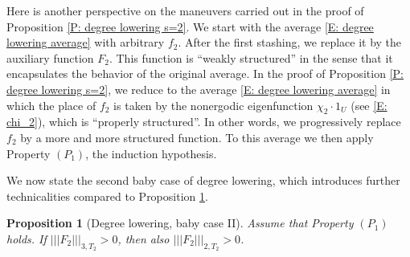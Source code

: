 \documentclass[11pt]{amsart}
\newtheorem{proposition}[lemma]{Proposition}
\theoremstyle{definition}
\newcommand{\nnorm}[1]{\lvert\!|\!| #1|\!|\!\rvert}
\newcommand{\1}{{\mathbf{1}}}
\begin{document}
Here is another perspective on the maneuvers carried out in the proof of Proposition \ref{P: degree lowering s=2}. We start with the average \eqref{E: degree lowering average} with arbitrary $f_2$. After the first stashing, we replace it by the auxiliary function $F_2$. This function is ``weakly structured'' in the sense that it encapsulates the behavior of the original average. In the proof of Proposition \ref{P: degree lowering s=2}, we reduce to the average \eqref{E: degree lowering average} in which the place of $f_2$ is taken by the nonergodic eigenfunction $\chi_2\cdot 1_U$ (see \eqref{E: chi_2}), which is ``properly structured''. In other words, we progressively replace $f_2$ by a more and more structured function. To this average we then apply Property $(P_1)$, the induction hypothesis.

We now state the second baby case of degree lowering, which introduces further technicalities compared to Proposition \ref{P: degree lowering s=3}.
\begin{proposition}[Degree lowering, baby case II]\label{P: degree lowering s=3}
    Assume %
    that Property $(P_1)$ holds. If $\nnorm{F_2}_{3, T_2}>0$, then also $\nnorm{F_2}_{2, T_2}>0$. 
\end{proposition}
\end{document}
